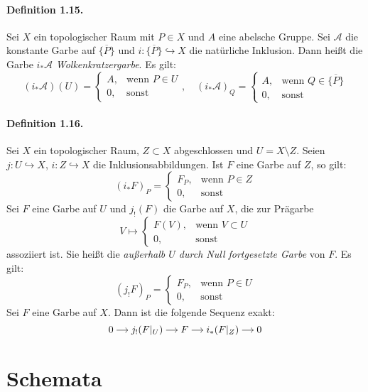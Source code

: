 \paragraph{Definition 1.15.}\label{1.15} Sei $X$ ein topologischer Raum mit $P\in X$ und $A$ eine abelsche Gruppe. Sei $\mathcal{A}$ die konstante Garbe auf $\overline{\{P\}}$ und $i:\overline{\{P\}}\hookrightarrow X$ die natürliche Inklusion. Dann heißt die Garbe $i_\ast \mathcal{A}$ \textit{Wolkenkratzergarbe}. Es gilt:
\[(i_\ast\mathcal{A})(U) = \begin{cases}
A, &\text{wenn } P\in U\\
0, &\text{sonst}
\end{cases},\quad (i_\ast \mathcal{A})_Q = \begin{cases}
A,&\text{wenn } Q\in\overline{\{P\}}\\
0,&\text{sonst}
\end{cases} \]

\paragraph{Definition 1.16.}\label{1.16} Sei $X$ ein topologischer Raum, $Z\subset X$ abgeschlossen und $U=X\setminus Z$. Seien $j:U\hookrightarrow X$, $i:Z\hookrightarrow X$ die Inklusionsabbildungen. Ist $F$ eine Garbe auf $Z$, so gilt:
\[(i_\ast F)_P=\begin{cases}
F_P, &\text{wenn }P\in Z\\
0, &\text{sonst}
\end{cases} \]
Sei $F$ eine Garbe auf $U$ und $j_!(F)$ die Garbe auf $X$, die zur Prägarbe
\[V\mapsto\begin{cases}
F(V),&\text{wenn }V\subset U\\
0,&\text{sonst}
\end{cases} \]
assoziiert ist. Sie heißt die \textit{außerhalb $U$ durch Null fortgesetzte Garbe} von $F$. Es gilt:
\[(j_!F)_P=\begin{cases}
F_P,&\text{wenn }P\in U\\
0,&\text{sonst}
\end{cases} \]
Sei $F$ eine Garbe auf $X$. Dann ist die folgende Sequenz exakt:
\[\begin{tikzcd}[cramped, sep=small]
0\ar[r] & j_!(F|_U)\ar[r] & F \ar[r]& i_\ast(F|_Z)\ar[r] & 0
\end{tikzcd} \]

\section{Schemata}

